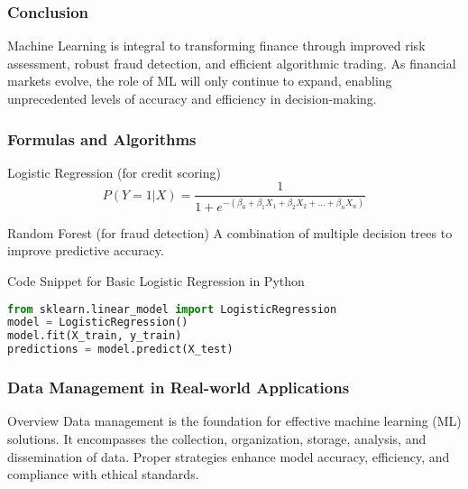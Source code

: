 \documentclass{beamer}
\begin{document}
\begin{frame}[fragile]
    \frametitle{Conclusion}
    Machine Learning is integral to transforming finance through improved risk assessment, robust fraud detection, and efficient algorithmic trading. 
    As financial markets evolve, the role of ML will only continue to expand, enabling unprecedented levels of accuracy and efficiency in decision-making.
\end{frame}

\begin{frame}[fragile]
    \frametitle{Formulas and Algorithms}
    \begin{block}{Logistic Regression (for credit scoring)}
        \begin{equation}
        P(Y=1|X) = \frac{1}{1 + e^{-(\beta_0 + \beta_1X_1 + \beta_2X_2 + \ldots + \beta_nX_n)}}
        \end{equation}
    \end{block}

    \begin{block}{Random Forest (for fraud detection)}
        A combination of multiple decision trees to improve predictive accuracy.
    \end{block}

    \begin{block}{Code Snippet for Basic Logistic Regression in Python}
        \begin{lstlisting}[language=Python]
from sklearn.linear_model import LogisticRegression
model = LogisticRegression()
model.fit(X_train, y_train)
predictions = model.predict(X_test)
        \end{lstlisting}
    \end{block}
\end{frame}

\begin{frame}[fragile]
    \frametitle{Data Management in Real-world Applications}
    \begin{block}{Overview}
        Data management is the foundation for effective machine learning (ML) solutions. It encompasses the collection, organization, storage, analysis, and dissemination of data. Proper strategies enhance model accuracy, efficiency, and compliance with ethical standards.
    \end{block}
\end{frame}
\end{document}
